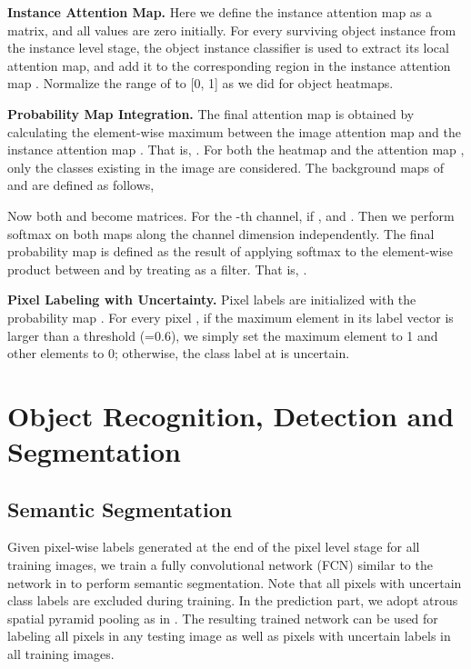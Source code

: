 \documentclass[10pt,twocolumn,letterpaper]{article}
\begin{document}
\noindent\textbf{Instance Attention Map.} Here we define the instance attention map  as a  matrix, and all values are zero initially. For every surviving object instance from the instance level stage, the object instance classifier  is used to extract its local attention map, and add it to the corresponding region in the instance attention map . Normalize the range of  to [0, 1] as we did for object heatmaps.

\noindent\textbf{Probability Map Integration.} The final attention map  is obtained by calculating the element-wise maximum between the image attention map  and the instance attention map . That is, . For both the heatmap  and the attention map , only the classes existing in the image are considered. The background maps of  and  are defined as follows,
    


Now both  and  become  matrices. For the -th channel, if ,  and . Then we perform softmax on both maps along the channel dimension independently. The final probability map  is defined as the result of applying softmax to the element-wise product between  and  by treating  as a filter. That is, .

\noindent\textbf{Pixel Labeling with Uncertainty.} Pixel labels  are initialized with the probability map . For every pixel , if the maximum element in its label vector  is larger than a threshold (=0.6), we simply set the maximum element to 1 and other elements to 0; otherwise, the class label at  is uncertain.


\section{Object Recognition, Detection and Segmentation}

\subsection{Semantic Segmentation}\label{sec:segmentation}
Given pixel-wise labels generated at the end of the pixel level stage for all training images, we train a fully convolutional network (FCN) similar to the network in \cite{long2015fully} to perform semantic segmentation. Note that all pixels with uncertain class labels are excluded during training.
In the prediction part, we adopt atrous spatial pyramid pooling as in \cite{chen2017rethinking}. The resulting trained network can be used for labeling all pixels in any testing image as well as pixels with uncertain labels in all training images.
\end{document}
